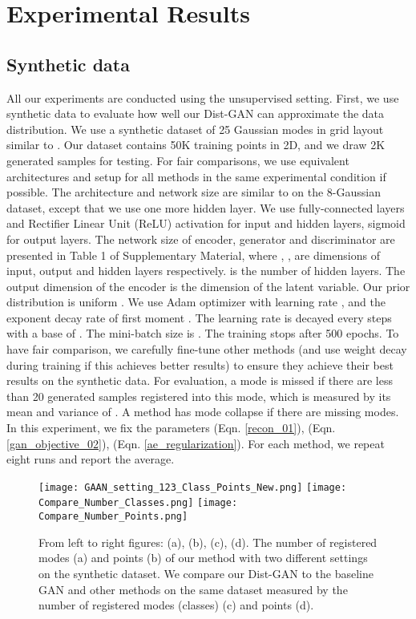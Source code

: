 \documentclass[runningheads]{llncs}
\begin{document}
\section{Experimental Results}
\subsection{Synthetic data}
\label{synthetic_data_experiment}
All our experiments are conducted using the unsupervised setting.
First, we use  synthetic data to evaluate how well our Dist-GAN can approximate the data distribution. We use a synthetic dataset of 25 Gaussian modes in grid layout similar to \cite{dumoulin-arxiv-2016}. Our dataset contains 50K training points in 2D, and we draw 2K generated samples for testing. For fair comparisons, we use equivalent architectures and setup for all methods in the same experimental condition if possible. The architecture and network size are similar to \cite{metz-arxiv-2016} on the 8-Gaussian dataset, except that we use one more hidden layer. We use fully-connected layers and Rectifier Linear Unit (ReLU) activation for input and hidden layers, sigmoid for output layers. The network size of encoder, generator and discriminator are presented in Table 1 of Supplementary Material, where , ,  are dimensions of input, output and hidden layers respectively.  is the number of hidden layers. The output dimension of the encoder is the dimension of the latent variable. Our prior distribution is  uniform . We use Adam optimizer with learning rate , and the exponent decay rate of first moment . The learning rate is decayed every  steps with a base of . The mini-batch size is . The training stops after 500 epochs. To have fair comparison, we carefully fine-tune other methods (and use weight decay during training if this achieves better results) to ensure they achieve their best results on the synthetic data. For evaluation, a mode is missed if there are less than 20 generated samples registered into this mode, which is measured by its mean and variance of  \cite{li-arxiv-2017,metz-arxiv-2016}. A method has mode collapse if there are missing modes. In this experiment, we fix the parameters  (Eqn. \ref{recon_01}),  (Eqn. \ref{gan_objective_02}),  (Eqn. \ref{ae_regularization}). For each method, we repeat eight runs and report the average.
\begin{figure*}
\centering
\texttt{[image: GAAN\_setting\_123\_Class\_Points\_New.png]}
\texttt{[image: Compare\_Number\_Classes.png]}
\texttt{[image: Compare\_Number\_Points.png]}
\caption{From left to right figures: (a), (b), (c), (d). The number of registered modes (a) and points (b) of our method with two different settings on the synthetic dataset. We compare our Dist-GAN to the baseline GAN \cite{goodfellow-nisp-2014} and other methods on the same dataset measured by the number of registered modes (classes) (c) and points (d).}
\label{toydata_comparison_01}
\end{figure*}
\end{document}
